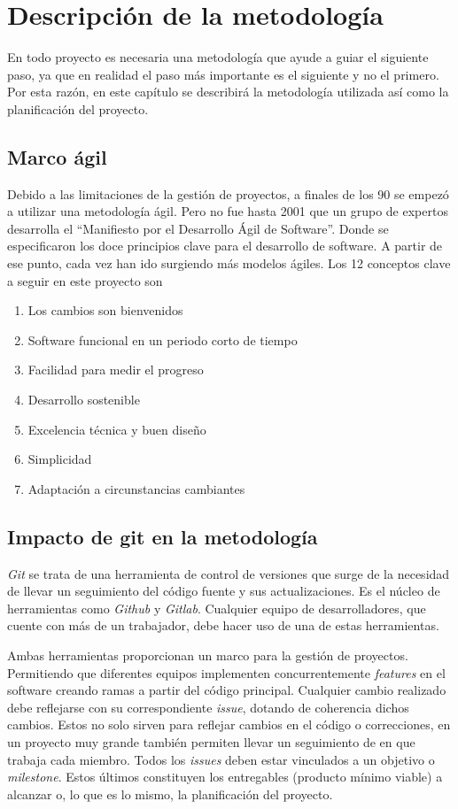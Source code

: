 \chapter{Descripción de la metodología}
En todo proyecto es necesaria una metodología que ayude a guiar el siguiente paso, ya que en realidad el paso más importante es el siguiente y no el primero. Por esta razón, en este capítulo se describirá la metodología utilizada así como la planificación del proyecto.

\section{Marco ágil}
Debido a las limitaciones de la gestión de proyectos, a finales de los 90 se empezó a utilizar una metodología ágil. Pero no fue hasta 2001 que un grupo de expertos desarrolla el ``Manifiesto por el Desarrollo Ágil de Software''. Donde se especificaron los doce principios clave para el desarrollo de software. A partir de ese punto, cada vez han ido surgiendo más modelos ágiles. Los 12 conceptos clave\cite{OBS2016} a seguir en este proyecto son\:
\begin{enumerate}
    \item Los cambios son bienvenidos
    \item Software funcional en un periodo corto de tiempo
    \item Facilidad para medir el progreso
    \item Desarrollo sostenible
    \item Excelencia técnica y buen diseño
    \item Simplicidad
    \item Adaptación a circunstancias cambiantes
\end{enumerate}

\section{Impacto de git en la metodología}
\emph{Git} se trata de una herramienta de control de versiones que surge de la necesidad de llevar un seguimiento del código fuente y sus actualizaciones. Es el núcleo de herramientas como \emph{Github} y \emph{Gitlab}. Cualquier equipo de desarrolladores, que cuente con más de un trabajador, debe hacer uso de una de estas herramientas.

Ambas herramientas proporcionan un marco para la gestión de proyectos. Permitiendo que diferentes equipos implementen concurrentemente \emph{features} en el software creando ramas a partir del código principal. Cualquier cambio realizado debe reflejarse con su correspondiente \emph{issue}, dotando de coherencia dichos cambios. Estos no solo sirven para reflejar cambios en el código o correcciones, en un proyecto muy grande también permiten llevar un seguimiento de en que trabaja cada miembro. Todos los \emph{issues} deben estar vinculados a un objetivo o \emph{milestone}. Estos últimos constituyen los entregables (producto mínimo viable) a alcanzar o, lo que es lo mismo, la planificación del proyecto.

